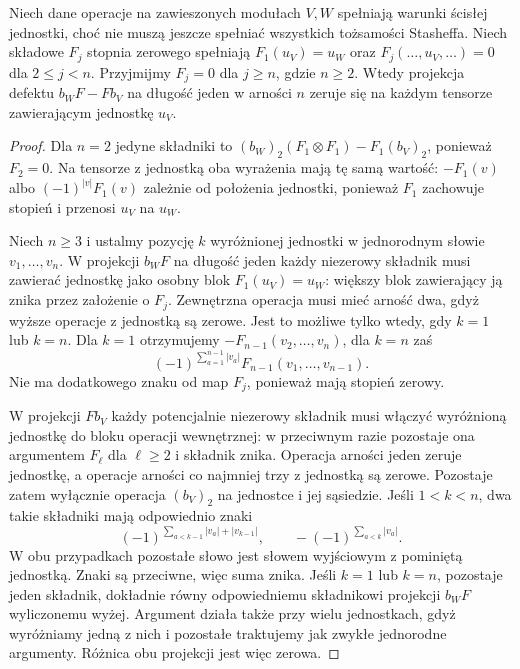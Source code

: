 \begin{lemat}\label{cat:lem:ainfty-normalized-defect}
Niech dane operacje na zawieszonych modułach $V,W$ spełniają warunki ścisłej jednostki, choć nie muszą jeszcze spełniać wszystkich tożsamości Stasheffa. Niech składowe $F_j$ stopnia zerowego spełniają $F_1(u_V)=u_W$ oraz $F_j(\ldots,u_V,\ldots)=0$ dla $2\leq j<n$. Przyjmijmy $F_j=0$ dla $j\geq n$, gdzie $n\geq2$. Wtedy projekcja defektu $b_WF-Fb_V$ na długość jeden w arności $n$ zeruje się na każdym tensorze zawierającym jednostkę $u_V$.
\end{lemat}
\begin{proof}
Dla $n=2$ jedyne składniki to $(b_W)_2(F_1\otimes F_1)-F_1(b_V)_2$, ponieważ $F_2=0$. Na tensorze z jednostką oba wyrażenia mają tę samą wartość: $-F_1(v)$ albo $(-1)^{|v|}F_1(v)$ zależnie od położenia jednostki, ponieważ $F_1$ zachowuje stopień i przenosi $u_V$ na $u_W$.

Niech $n\geq3$ i ustalmy pozycję $k$ wyróżnionej jednostki w jednorodnym słowie $v_1,\ldots,v_n$. W projekcji $b_WF$ na długość jeden każdy niezerowy składnik musi zawierać jednostkę jako osobny blok $F_1(u_V)=u_W$: większy blok zawierający ją znika przez założenie o $F_j$. Zewnętrzna operacja musi mieć arność dwa, gdyż wyższe operacje z jednostką są zerowe. Jest to możliwe tylko wtedy, gdy $k=1$ lub $k=n$. Dla $k=1$ otrzymujemy $-F_{n-1}(v_2,\ldots,v_n)$, dla $k=n$ zaś
\[
 (-1)^{\sum_{a=1}^{n-1}|v_a|}F_{n-1}(v_1,\ldots,v_{n-1}).
\]
Nie ma dodatkowego znaku od map $F_j$, ponieważ mają stopień zerowy.

W projekcji $Fb_V$ każdy potencjalnie niezerowy składnik musi włączyć wyróżnioną jednostkę do bloku operacji wewnętrznej: w przeciwnym razie pozostaje ona argumentem $F_\ell$ dla $\ell\geq2$ i składnik znika. Operacja arności jeden zeruje jednostkę, a operacje arności co najmniej trzy z jednostką są zerowe. Pozostaje zatem wyłącznie operacja $(b_V)_2$ na jednostce i jej sąsiedzie. Jeśli $1<k<n$, dwa takie składniki mają odpowiednio znaki
\[
 (-1)^{\sum_{a<k-1}|v_a|+|v_{k-1}|},
 \qquad -(-1)^{\sum_{a<k}|v_a|}.
\]
W obu przypadkach pozostałe słowo jest słowem wyjściowym z pominiętą jednostką. Znaki są przeciwne, więc suma znika. Jeśli $k=1$ lub $k=n$, pozostaje jeden składnik, dokładnie równy odpowiedniemu składnikowi projekcji $b_WF$ wyliczonemu wyżej. Argument działa także przy wielu jednostkach, gdyż wyróżniamy jedną z nich i pozostałe traktujemy jak zwykłe jednorodne argumenty. Różnica obu projekcji jest więc zerowa.
\end{proof}

